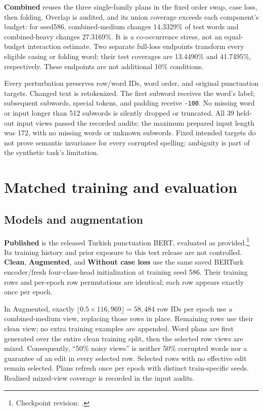 \documentclass{article}
\begin{document}
\textbf{Combined} reuses the three single-family plans in the fixed order
swap, case loss, then folding. Overlap is audited, and its union coverage exceeds
each component's budget: for seed586, combined-medium changes 14.3329\% of test
words and combined-heavy changes 27.3169\%. It is a co-occurrence stress, not an
equal-budget interaction estimate. Two separate full-loss endpoints transform
every eligible casing or folding word; their test coverages are 13.4490\% and
41.7495\%, respectively. These endpoints are not additional 10\% conditions.

Every perturbation preserves row/word IDs, word order, and original punctuation
targets. Changed text is retokenized. The first subword receives the word's
label; subsequent subwords, special tokens, and padding receive \texttt{-100}.
No missing word or input longer than 512 subwords is silently dropped or
truncated. All 39 held-out input views passed the recorded audits; the maximum
prepared input length was 172, with no missing words or unknown subwords.
Fixed intended targets do not prove semantic invariance for every corrupted
spelling; ambiguity is part of the synthetic task's limitation.

\section{Matched training and evaluation}
\subsection{Models and augmentation}
\textbf{Published} is the released Turkish punctuation BERT, evaluated as
provided.\footnote{Checkpoint revision: .}
Its training history and prior exposure to this test release are not controlled.
\textbf{Clean}, \textbf{Augmented}, and \textbf{Without case loss} use the same
saved BERTurk encoder/fresh four-class-head initialization at training seed 586.
Their training rows and per-epoch row permutations are identical; each row
appears exactly once per epoch.

In Augmented, exactly $\lfloor0.5\times116{,}969\rfloor=58{,}484$ row IDs per
epoch use a combined-medium view, replacing those rows in place. Remaining rows
use their clean view; no extra training examples are appended. Word plans are
first generated over the entire clean training split, then the selected row
views are mixed. Consequently, ``50\% noisy views'' is neither 50\% corrupted
words nor a guarantee of an edit in every selected row. Selected rows with no
effective edit remain selected. Plans refresh once per epoch with distinct
train-specific seeds. Realized mixed-view coverage is recorded in the input
audits.
\end{document}
